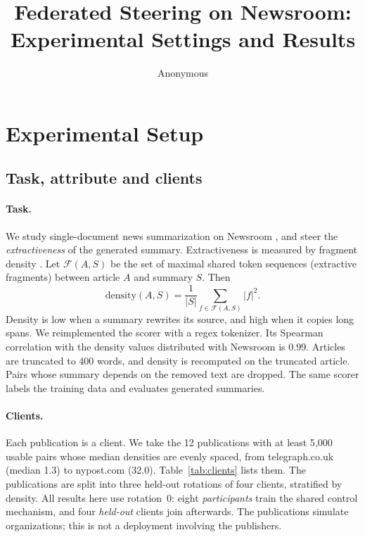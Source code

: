 \documentclass[11pt]{article}
\title{Federated Steering on Newsroom: Experimental Settings and Results}
\author{Anonymous}
\begin{document}
\maketitle

\section{Experimental Setup}
\label{sec:setup}

\subsection{Task, attribute and clients}
\label{sec:setup-data}

\paragraph{Task.}
We study single-document news summarization on Newsroom \citep{grusky-etal-2018-newsroom}, and steer the \emph{extractiveness} of the generated summary.
Extractiveness is measured by fragment density \citep{grusky-etal-2018-newsroom}.
Let $\mathcal{F}(A,S)$ be the set of maximal shared token sequences (extractive fragments) between article $A$ and summary $S$.
Then
\begin{equation}
  \mathrm{density}(A,S) = \frac{1}{|S|}\sum_{f\in\mathcal{F}(A,S)} |f|^{2}.
\end{equation}
Density is low when a summary rewrites its source, and high when it copies long spans.
We reimplemented the scorer with a regex tokenizer. Its Spearman correlation with the density values distributed with Newsroom is 0.99.
Articles are truncated to 400 words, and density is recomputed on the truncated article.
Pairs whose summary depends on the removed text are dropped.
The same scorer labels the training data and evaluates generated summaries.

\paragraph{Clients.}
Each publication is a client.
We take the 12 publications with at least 5{,}000 usable pairs whose median densities are evenly spaced, from telegraph.co.uk (median 1.3) to nypost.com (32.0).
Table~\ref{tab:clients} lists them.
The publications are split into three held-out rotations of four clients, stratified by density.
All results here use rotation~0: eight \emph{participants} train the shared control mechanism, and four \emph{held-out} clients join afterwards.
The publications simulate organizations; this is not a deployment involving the publishers.
\end{document}
